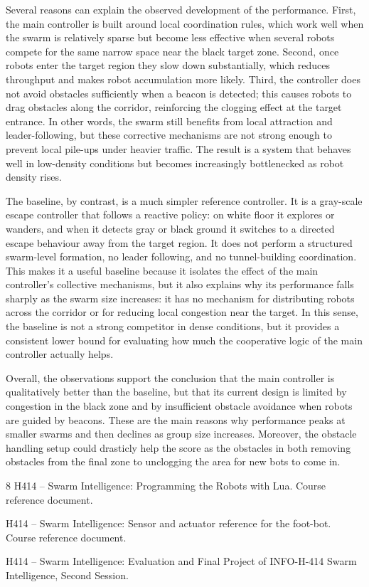 \documentclass[runningheads]{llncs}
\begin{document}
Several reasons can explain the observed development of the performance. First, the main controller is built around local coordination rules, which work well when the swarm is relatively sparse but become less effective when several robots compete for the same narrow space near the black target zone. Second, once robots enter the target region they slow down substantially, which reduces throughput and makes robot accumulation more likely. Third, the controller does not avoid obstacles sufficiently when a beacon is detected; this causes robots to drag obstacles along the corridor, reinforcing the clogging effect at the target entrance. In other words, the swarm still benefits from local attraction and leader-following, but these corrective mechanisms are not strong enough to prevent local pile-ups under heavier traffic. The result is a system that behaves well in low-density conditions but becomes increasingly bottlenecked as robot density rises.

The baseline, by contrast, is a much simpler reference controller. It is a gray-scale escape controller that follows a reactive policy: on white floor it explores or wanders, and when it detects gray or black ground it switches to a directed escape behaviour away from the target region. It does not perform a structured swarm-level formation, no leader following, and no tunnel-building coordination. This makes it a useful baseline because it isolates the effect of the main controller's collective mechanisms, but it also explains why its performance falls sharply as the swarm size increases: it has no mechanism for distributing robots across the corridor or for reducing local congestion near the target. In this sense, the baseline is not a strong competitor in dense conditions, but it provides a consistent lower bound for evaluating how much the cooperative logic of the main controller actually helps.

Overall, the observations support the conclusion that the main controller is qualitatively better than the baseline, but that its current design is limited by congestion in the black zone and by insufficient obstacle avoidance when robots are guided by beacons. 
These are the main reasons why performance peaks at smaller swarms and then declines as group size increases. Moreover, the obstacle handling setup could drasticly help the score as the obstacles in both removing obstacles from the final zone to unclogging the area for new bots to come in.

\begin{thebibliography}{8}
H414 -- Swarm Intelligence: Programming the Robots with Lua. Course reference document.

H414 -- Swarm Intelligence: Sensor and actuator reference for the foot-bot. Course reference document.

H414 -- Swarm Intelligence: Evaluation and Final Project of INFO-H-414 Swarm Intelligence, Second Session.
\end{thebibliography}
\end{document}
